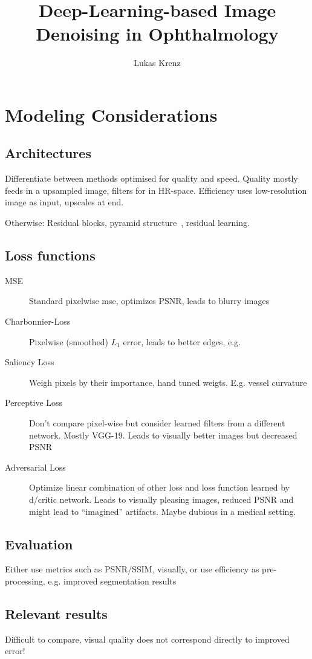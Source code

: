 \documentclass{scrartcl}
\begin{document}
\title{Deep-Learning-based Image Denoising in Ophthalmology}
\author{Lukas Krenz}

\maketitle

\section{Modeling Considerations}

\subsection{Architectures}
\label{sec:architecturs}
Differentiate between methods optimised for quality and speed.
Quality mostly feeds in a upsampled image, filters for in HR-space.
Efficiency uses low-resolution image as input, upscales at end.

Otherwise:
Residual blocks, pyramid structure~\cite{LapSRN}, residual learning.

\subsection{Loss functions}
\label{sec:loss}

\begin{description}
\item[MSE] Standard pixelwise mse, optimizes PSNR, leads to blurry images
\item[Charbonnier-Loss] Pixelwise (smoothed) $L_1$ error, leads to better edges, e.g.~\cite{LapSRN}
\item[Saliency Loss] Weigh pixels by their importance, hand tuned weigts.
  E.g. vessel curvature
\item[Perceptive Loss] Don't compare pixel-wise but consider learned filters from a different network.
  Mostly VGG-19. Leads to visually better images but decreased PSNR
\item[Adversarial Loss] Optimize linear combination of other loss and loss function learned by d/critic network.
  Leads to visually pleasing images, reduced PSNR and might lead to ``imagined'' artifacts.
  Maybe dubious in a medical setting.
\end{description}
\subsection{Evaluation}
Either use metrics such as PSNR/SSIM, visually, or use efficiency as pre-processing, e.g. improved segmentation results
\label{sec:evaluation}

\subsection{Relevant results}
Difficult to compare, visual quality does not correspond directly to improved error!

\printbibliography
\end{document}
